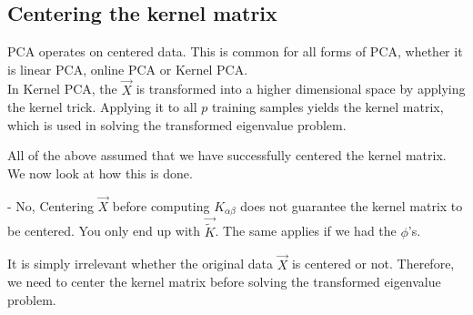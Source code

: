 \subsection{Centering the kernel matrix}

\begin{frame}{\subsecname}

PCA operates on centered data. This is common for all forms  of PCA, 
whether it is linear PCA, online PCA or Kernel PCA.\\
In Kernel PCA, the $\vec X$ is transformed into a higher dimensional space by applying the kernel trick.
Applying it to all $p$ training samples yields the kernel matrix, which is used in solving the transformed eigenvalue problem.

All of the above assumed that we have successfully centered the kernel matrix. We now look at how this is done.

\end{frame}


\begin{frame}{\subsecname}



\pause

- No, Centering $\vec X$ before computing $K_{\alpha \beta}$ does not guarantee the kernel matrix to be centered. You only end up with $\vec{\widetilde K}$. The same applies if we had the $\phi$'s.

It is simply irrelevant whether the original data $\vec X$ is centered or not. 
Therefore, we need to center the kernel matrix before solving the transformed eigenvalue problem.\\

\end{frame}

